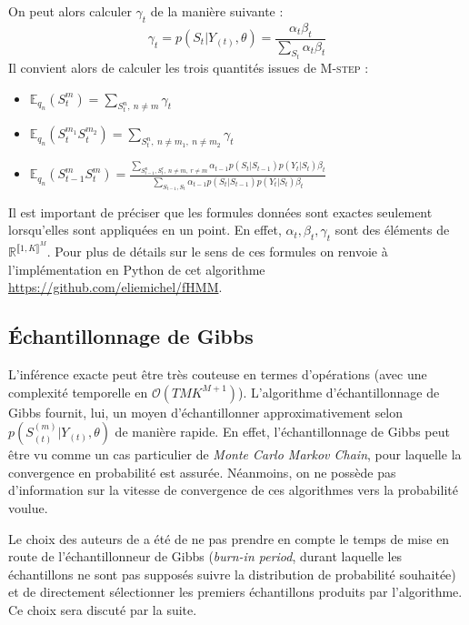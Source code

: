 \documentclass[10pt,a4paper]{article}
\newcommand{\Mstep}{\textsc{M-step}}
\begin{document}
On peut alors calculer $\gamma_t$ de la manière suivante :
\begin{equation}
\gamma_t=p(S_t \vert Y_{(t)}, \theta)= \frac{\alpha_t 
\beta_t}{\underset{S_t}{\sum} \alpha_t \beta_t}
\end{equation}
Il convient alors de calculer les trois quantités issues de \Mstep{} :
\begin{itemize}
\item $\mathbb{E}_{q_n}(S_t^m)= \underset{S_t^n, \ n \neq m}{\sum} \gamma_t$
\item $\mathbb{E}_{q_n}(S_t^{m_1}S_t^{m_2})= \underset{S_t^n, \ n \neq m_1, \ n 
\neq m_2}{\sum} \gamma_t$
\item $\mathbb{E}_{q_n}(S_{t-1}^mS_t^m)= \frac{\underset{S_{t-1}^n,S_t^r, \ n 
\neq m, \ r \neq m}{\sum}\alpha_{t-1} p(S_t \vert S_{t-1}) p(Y_t \vert S_t) 
\beta_t}{\underset{S_{t-1}, S_t}{\sum}\alpha_{t-1}p(S_t \vert S_{t-1})p(Y_t 
\vert S_t) \beta_t} $
\end{itemize}
Il est important de préciser que les formules données sont exactes seulement 
lorsqu'elles sont appliquées en un point. En effet, $\alpha_t, \beta_t, 
\gamma_t$ sont des éléments de $\mathbb{R}^{\llbracket 1,K \rrbracket^M}$. Pour 
plus de détails sur le sens de ces formules on renvoie à l'implémentation en 
Python de cet algorithme \href{url}{https://github.com/eliemichel/fHMM}.

\subsection{Échantillonnage de Gibbs}

L'inférence exacte peut être très couteuse en termes d'opérations (avec une
complexité temporelle en $\mathcal{O}(TMK^{M+1})$).
L'algorithme d'échantillonnage de Gibbs fournit, lui, un moyen d'échantillonner
approximativement selon $p(S_{(t)}^{(m)} \vert  Y_{(t)}, \theta)$ de
manière rapide.
En effet, l'échantillonnage de Gibbs peut être vu comme un cas particulier de
\emph{Monte Carlo Markov Chain}, pour laquelle la convergence en probabilité est
assurée.
Néanmoins, on ne possède pas d'information sur la vitesse de convergence de ces
algorithmes vers la probabilité voulue.

  Le choix des auteurs de \cite{ghahramani1997factorial} a été de ne pas prendre
en compte le temps de mise en route de l'échantillonneur de Gibbs
(\og{}\emph{burn-in period}\fg{}, durant laquelle les échantillons ne sont pas supposés
suivre la distribution de probabilité souhaitée) et de directement sélectionner
les premiers échantillons produits par l'algorithme.
Ce choix sera discuté par la suite.
\end{document}
